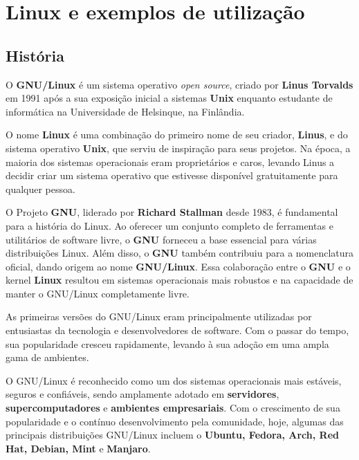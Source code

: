 ﻿\section{Linux e exemplos de utilização} \label{section: linux e exemplos}
\subsection{História}
O \textbf{GNU/Linux} é um sistema operativo \textit{open source}, criado por \textbf{Linus Torvalds} em 1991 após a sua exposição inicial a sistemas \textbf{Unix} enquanto estudante de informática na Universidade de Helsinque, na Finlândia.
\par \vspace{6pt}
O nome \textbf{Linux} é uma combinação do primeiro nome de seu criador, \textbf{Linus}, e do sistema operativo \textbf{Unix}, que serviu de inspiração para seus projetos. Na época, a maioria dos sistemas operacionais eram proprietários e caros, levando Linus a decidir criar um sistema operativo que estivesse disponível gratuitamente para qualquer pessoa. \cite{linuxHistory}
\par \vspace{6pt}
O Projeto \textbf{GNU}, liderado por \textbf{Richard Stallman} desde 1983, é fundamental para a história do Linux. Ao oferecer um conjunto completo de ferramentas e utilitários de software livre, o \textbf{GNU} forneceu a base essencial para várias distribuições Linux. Além disso, o \textbf{GNU} também contribuiu para a nomenclatura oficial, dando origem ao nome \textbf{GNU/Linux}. Essa colaboração entre o \textbf{GNU} e o kernel \textbf{Linux} resultou em sistemas operacionais mais robustos e na capacidade de manter o GNU/Linux completamente livre. \cite{gnuHistory}
\par \vspace{6pt}
As primeiras versões do GNU/Linux eram principalmente utilizadas por entusiastas da tecnologia e desenvolvedores de software. Com o passar do tempo, sua popularidade cresceu rapidamente, levando à sua adoção em uma ampla gama de ambientes.
\par \vspace{6pt}
O GNU/Linux é reconhecido como um dos sistemas operacionais mais estáveis, seguros e confiáveis, sendo amplamente adotado em \textbf{servidores}, \textbf{supercomputadores} e \textbf{ambientes empresariais}. Com o crescimento de sua popularidade e o contínuo desenvolvimento pela comunidade, hoje, algumas das principais distribuições GNU/Linux incluem o \textbf{Ubuntu, Fedora, Arch, Red Hat, Debian, Mint} e \textbf{Manjaro}.
\par \vspace{12pt}

